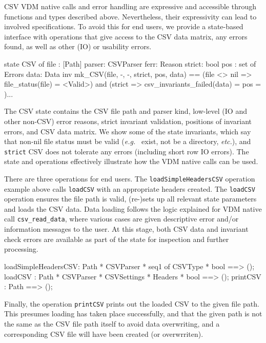 \documentclass[runningheads,a4paper]{llncs}
\begin{document}
CSV VDM native calls and error handling are expressive and accessible through functions and types described above. Nevertheless, their expressivity can lead to involved specifications. To avoid this for end users, we provide a state-based interface with operations that give access to the CSV data matrix, any errors found, as well as other (IO) or usability errors.     
%
\begin{vdmsl}[frame=none,basicstyle=\ttfamily\scriptsize]
    state CSV of 
        file  : [Path]   parser: CSVParser       ferr: Reason
        strict: bool     pos   : set of Errors   data: Data
    inv mk_CSV(file, -, -, strict, pos, data) == 
       (file <> nil => file_status(file) = <Valid>) and
       (strict => csv_invariants_failed(data) = pos = {})...
\end{vdmsl}
%
The CSV state contains the CSV file path and parser kind, low-level (IO and other non-CSV) error reasons, strict invariant validation, positions of invariant errors, and CSV data matrix. We show some of the state invariants, which say that non-nil file status must be valid (\textit{e.g.~} exist, not be a directory, \textit{etc.}), and \texttt{strict} CSV does not tolerate any errors (including short row IO errors). The state and operations effectively illustrate how the VDM native calls can be used.     

There are three operations for end users. The \texttt{loadSimpleHeadersCSV} operation example above calls \texttt{loadCSV} with an appropriate headers created. The \texttt{loadCSV} operation ensures the file path is valid, (re-)sets up all relevant state parameters and loads the CSV data. Data loading follows the logic explained for VDM native call \texttt{csv\_read\_data}, where various cases are given descriptive error and/or information messages to the user. At this stage, both CSV data and invariant check errors are available as part of the state for inspection and further processing.  
%
\begin{vdmsl}[frame=none,basicstyle=\scriptsize\ttfamily]
    loadSimpleHeadersCSV: Path * CSVParser * seq1 of CSVType * bool ==> ();
    loadCSV       : Path * CSVParser * CSVSettings * Headers * bool ==> ();
    printCSV      : Path ==> ();
\end{vdmsl}

Finally, the operation \texttt{printCSV} prints out the loaded CSV to the given file path. This presumes loading has taken place successfully, and that the given path is not the same as the CSV file path itself to avoid data overwriting, and a corresponding CSV file will have been created (or overwrriten).  
\end{document}
